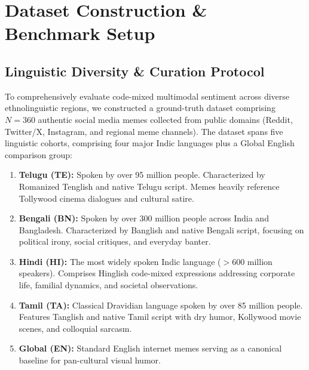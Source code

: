 \documentclass[10pt,journal,compsoc]{IEEEtran}
\begin{document}
\section{Dataset Construction \& Benchmark Setup}
\label{sec:dataset}

\subsection{Linguistic Diversity \& Curation Protocol}
To comprehensively evaluate code-mixed multimodal sentiment across diverse ethnolinguistic regions, we constructed a ground-truth dataset comprising $N=360$ authentic social media memes collected from public domains (Reddit, Twitter/X, Instagram, and regional meme channels). The dataset spans five linguistic cohorts, comprising four major Indic languages plus a Global English comparison group:
\begin{enumerate}
    \item \textbf{Telugu (TE):} Spoken by over 95 million people. Characterized by Romanized Tenglish and native Telugu script. Memes heavily reference Tollywood cinema dialogues and cultural satire.
    \item \textbf{Bengali (BN):} Spoken by over 300 million people across India and Bangladesh. Characterized by Banglish and native Bengali script, focusing on political irony, social critiques, and everyday banter.
    \item \textbf{Hindi (HI):} The most widely spoken Indic language ($>600$ million speakers). Comprises Hinglish code-mixed expressions addressing corporate life, familial dynamics, and societal observations.
    \item \textbf{Tamil (TA):} Classical Dravidian language spoken by over 85 million people. Features Tanglish and native Tamil script with dry humor, Kollywood movie scenes, and colloquial sarcasm.
    \item \textbf{Global (EN):} Standard English internet memes serving as a canonical baseline for pan-cultural visual humor.
\end{enumerate}
\end{document}
